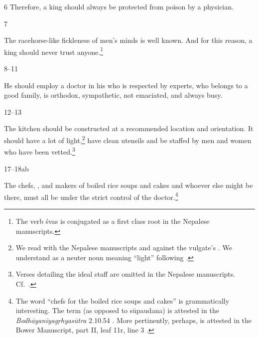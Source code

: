 \begin{translation}
\item[6] Therefore, a king should always be protected from poison by a physician.


\item [7] 

The racehorse-like fickleness of men's minds is well known. And for this reason, a
king should never trust anyone.\footnote{The verb \root śvas is conjugated as a
first class root in the Nepalese manuscripts.}

\item [8--11]

He should employ a doctor in his  who is respected by experts, who 
belongs to a good family, is orthodox, sympathetic, not emaciated, and always busy.

\item [12--13]

The kitchen should be constructed at a recommended location and orientation.  It should
have a lot of light,\footnote{We read  with the Nepalese manuscripts and 
against the vulgate's .  We understand  as a neuter noun 
meaning “light” following \citet[1050a]{apte-prac}.} have clean utensils and be staffed by 
men 
and
women who have been vetted.\footnote{Verses detailing the ideal staff are omitted in the 
Nepalese manuscripts. 
Cf.\ \cites[560]{susr-trikamji3}[132]{wuja-2003}.}


\item[17--18ab]

The chefs, , and makers of boiled rice soups and cakes and whoever
else might be there, must all be under the strict control of the
doctor.\footnote{The word  “chefs for the boiled rice soups
and cakes” is grammatically interesting.  The term  (as opposed to
sūpaudana) is attested in the \emph{Bodhāyanīya\-gṛhyasūtra} 2.10.54 
\citep[68]{shas-1920}.  More pertinently, perhaps,  is attested in
the Bower Manuscript, part II, leaf 11r, line 3 \citep[vol.\,1,
p.\,43]{hoer-bowe}.} 


\end{translation}
